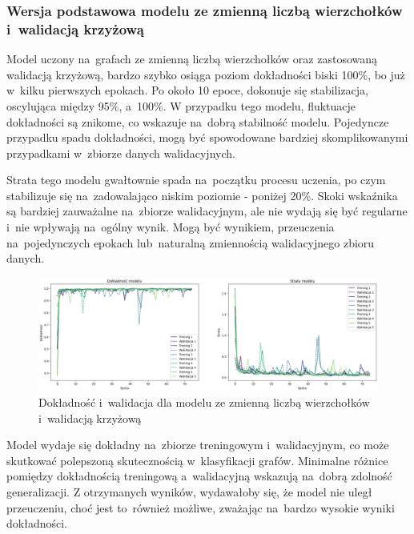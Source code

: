 \subsubsection{Wersja podstawowa modelu ze zmienną liczbą wierzchołków i~walidacją krzyżową}

Model uczony na~grafach ze zmienną liczbą wierzchołków oraz zastosowaną walidacją krzyżową,
bardzo szybko osiąga poziom dokładności biski 100\%, bo już w~kilku pierwszych epokach.
Po około 10 epoce, dokonuje się stabilizacja, oscylująca między 95\%, a~100\%.
W przypadku tego modelu, fluktuacje dokładności są znikome, co wskazuje na~dobrą stabilność modelu.
Pojedyncze przypadku spadu dokładności, mogą być spowodowane bardziej skomplikowanymi
przypadkami w~zbiorze danych walidacyjnych.

Strata tego modelu gwałtownie spada na~początku procesu uczenia,
po czym stabilizuje się na~zadowalająco niskim poziomie - poniżej 20\%.
Skoki wskaźnika są bardziej zauważalne na~zbiorze walidacyjnym,
ale nie wydają się być regularne i~nie wpływają na~ogólny wynik.
Mogą być wynikiem, przeuczenia na~pojedynczych epokach lub~naturalną zmiennością walidacyjnego zbioru danych.

\begin{figure}[ht]
	\centering
	\includegraphics[width=15.5cm]{resources/tests/images/v3/multiple_edges_crossvalid_img.png}
	\caption{Dokładność i~walidacja dla modelu ze zmienną liczbą wierzchołków i~walidacją krzyżową}
	\label{Fig:tests-csvar-0a}
\end{figure}
\FloatBarrier

Model wydaje się dokładny na~zbiorze treningowym i~walidacyjnym,
co może skutkować polepszoną skutecznością w~klasyfikacji grafów.
Minimalne różnice pomiędzy dokładnością treningową a~walidacyjną wskazują na~dobrą zdolność generalizacji.
Z otrzymanych wyników, wydawałoby się, że model nie uległ przeuczeniu,
choć jest to~również możliwe, zważając na~bardzo wysokie wyniki dokładności. 


